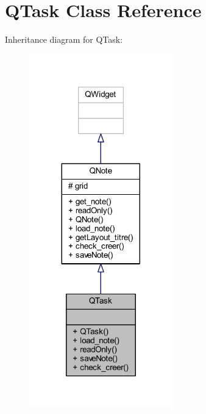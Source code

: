 \hypertarget{class_q_task}{}\section{Q\+Task Class Reference}
\label{class_q_task}


Inheritance diagram for Q\+Task\+:\nopagebreak
\begin{figure}[H]
\begin{center}
\leavevmode
\includegraphics[width=176pt]{class_q_task__inherit__graph}
\end{center}
\end{figure}


